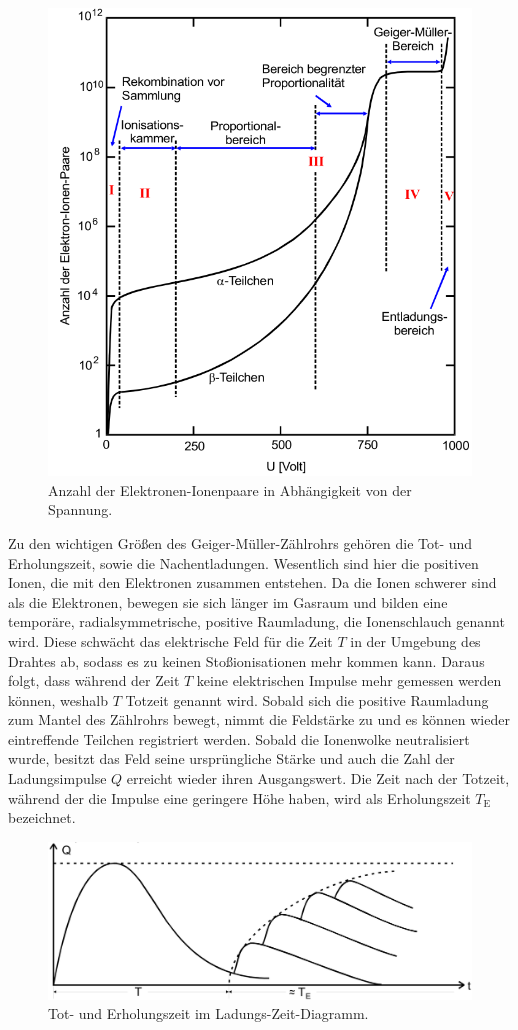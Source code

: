 \begin{figure}[h!tbp]
	\centering
	\includegraphics[width=0.7\linewidth]{bereiche.png}
	\caption{Anzahl der Elektronen-Ionenpaare in Abhängigkeit von der Spannung.\cite[2]{anleitung703}}
	\label{fig:bereiche}
\end{figure}

\newpage
Zu den wichtigen Größen des Geiger-Müller-Zählrohrs gehören die Tot- und Erholungszeit, sowie die Nachentladungen. Wesentlich sind hier die positiven Ionen, die mit den Elektronen zusammen entstehen. Da die Ionen schwerer sind als die Elektronen, bewegen 
sie sich länger im Gasraum und bilden eine temporäre, radialsymmetrische, positive Raumladung, die Ionenschlauch genannt wird. Diese schwächt das elektrische Feld für die Zeit $T$ in der Umgebung des Drahtes ab, sodass es zu keinen Stoßionisationen mehr kommen 
kann.  Daraus folgt, dass während der Zeit $T$ keine elektrischen Impulse mehr gemessen werden können, weshalb $T$ Totzeit genannt wird. Sobald sich die positive Raumladung zum Mantel des Zählrohrs bewegt, nimmt die Feldstärke zu und es können wieder 
eintreffende Teilchen registriert werden. Sobald die Ionenwolke neutralisiert wurde, besitzt das Feld seine ursprüngliche Stärke und auch die Zahl der Ladungsimpulse $Q$ erreicht wieder ihren Ausgangswert. Die Zeit nach der Totzeit, während der die Impulse eine 
geringere Höhe haben, wird als Erholungszeit $T_{\text{E}}$ bezeichnet.

\begin{figure}[h!tbp]
	\centering
	\includegraphics[width=0.9\linewidth]{zeiten.png}
	\caption{Tot- und Erholungszeit im Ladungs-Zeit-Diagramm.\cite[4]{anleitung703}}
	\label{fig:zeiten}
\end{figure}

